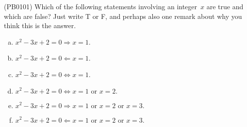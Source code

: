 (PB0101) Which of the following statements involving an integer~$x$ are true and which are false? Just write T or F, and perhaps also one remark about why you think this is the answer.
\begin{multicols}{2}
\begin{enumerate}[(a)]
\item $x^2-3x+2=0\Rightarrow x=1$.
\item $x^2-3x+2=0\Leftarrow x=1$.
\item $x^2-3x+2=0\iff x=1$.
\item $x^2-3x+2=0\iff x=1\mbox{ or }x=2.$
\item $x^2-3x+2=0\Rightarrow x=1\mbox{ or }x=2\mbox{ or }x=3.$
\item $x^2-3x+2=0\Leftarrow x=1\mbox{ or }x=2\mbox{ or }x=3.$
\end{enumerate}
\end{multicols}

